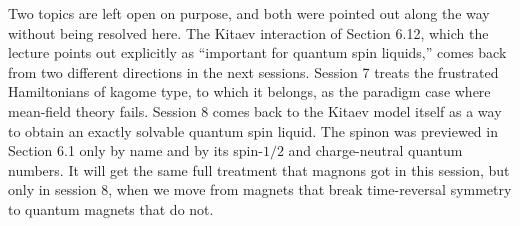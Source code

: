 Two topics are left open on purpose, and both were pointed out along the way without being resolved
here. The Kitaev interaction of Section 6.12, which the lecture points out explicitly as ``important
for quantum spin liquids,'' comes back from two different directions in the next sessions. Session 7
treats the frustrated Hamiltonians of kagome type, to which it belongs, as the paradigm case where
mean-field theory fails. Session 8 comes back to the Kitaev model itself as a way to obtain an exactly
solvable quantum spin liquid. The spinon was previewed in Section 6.1 only by name and by its
spin-$1/2$ and charge-neutral quantum numbers. It will get the same full treatment that magnons got in
this session, but only in session 8, when we move from magnets that break time-reversal symmetry to
quantum magnets that do not.
